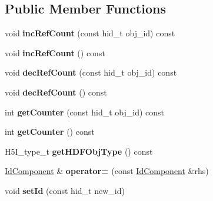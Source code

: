 \subsection*{Public Member Functions}
\begin{DoxyCompactItemize}
\item 
\mbox{\label{class_h5_1_1_id_component_a76eb496539e6cda23dbb30156fe3ff4a}} 
void {\bfseries inc\+Ref\+Count} (const hid\+\_\+t obj\+\_\+id) const
\item 
\mbox{\label{class_h5_1_1_id_component_a134f6652ff81848e277521fa958707eb}} 
void {\bfseries inc\+Ref\+Count} () const
\item 
\mbox{\label{class_h5_1_1_id_component_a4fb6f2791036dd7793ad465203b857e5}} 
void {\bfseries dec\+Ref\+Count} (const hid\+\_\+t obj\+\_\+id) const
\item 
\mbox{\label{class_h5_1_1_id_component_ad00eaf3bc0848fa976c1b17aa9a3f22e}} 
void {\bfseries dec\+Ref\+Count} () const
\item 
\mbox{\label{class_h5_1_1_id_component_a0e5fba13e884a3d857aae9bf07ebf427}} 
int {\bfseries get\+Counter} (const hid\+\_\+t obj\+\_\+id) const
\item 
\mbox{\label{class_h5_1_1_id_component_a6acc21053f0485d7d47721eb7d5ac88c}} 
int {\bfseries get\+Counter} () const
\item 
\mbox{\label{class_h5_1_1_id_component_ab1f88ad0583b9e53001505f7dbdecc82}} 
H5\+I\+\_\+type\+\_\+t {\bfseries get\+H\+D\+F\+Obj\+Type} () const
\item 
\mbox{\label{class_h5_1_1_id_component_afc33cc8a88117526bf1a344a8a16f6b5}} 
\hyperlink{class_h5_1_1_id_component}{Id\+Component} \& {\bfseries operator=} (const \hyperlink{class_h5_1_1_id_component}{Id\+Component} \&rhs)
\item 
\mbox{\label{class_h5_1_1_id_component_a1e46d85ec29cd77bb1767cd01b8f0c8d}} 
void {\bfseries set\+Id} (const hid\+\_\+t new\+\_\+id)

\end{DoxyCompactItemize}
